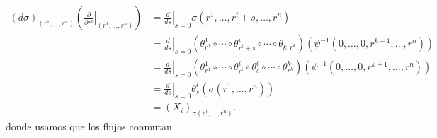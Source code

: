 \begin{bookproof}{}
\[
\begin{aligned}(d\sigma)_{(r^1,\ldots,r^n)}\left(\left.\frac{\partial}{\partial r^i}\right|_{(r^1,\ldots,r^n)}\right)&=\left.\frac{d}{ds}\right|_{s=0}\sigma(r^1,\ldots,r^i+s,\ldots,r^n)\\&=\left.\frac{d}{ds}\right|_{s=0}\left(\theta^{1} _{r^1}\circ\cdots\circ\theta^{i} _{r^i+s}\circ\cdots\circ\theta_{k,r^k}\right)\left(\psi^{-1}(0,\ldots,0,r^{k+1},\ldots,r^n)\right)\\&=\left.\frac{d}{ds}\right|_{s=0}\left(\theta^{1} _{r^1}\circ\cdots\circ\theta^{i} _{r^i}\circ\theta^{i} _{s}\circ\cdots\circ\theta^{k} _{r^k}\right)\left(\psi^{-1}(0,\ldots,0,r^{k+1},\ldots,r^n)\right)\\&=\left.\frac{d}{ds}\right|_{s=0}\theta^{i} _{s}\left(\sigma(r^1,\ldots,r^n)\right)\\&=(X_i)_{\sigma(r^1,\ldots,r^n)}.\end{aligned}
\]
donde usamos que los flujos conmutan

\bookqed
\end{bookproof}
